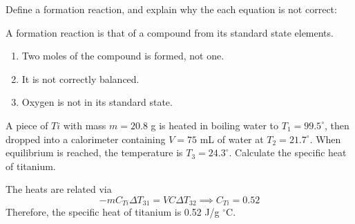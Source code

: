 \documentclass[answers]{exam}
\begin{document}
\begin{questions}
\bigskip
\question Define a formation reaction, and explain why the each equation is not correct:
%
\begin{solutionbox}{1.1in}
  A formation reaction is that of a compound from its standard state elements.
  \begin{enumerate}
    \item Two moles of the compound is formed, not one.
    \item It is not correctly balanced.
    \item Oxygen is not in its standard state.
  \end{enumerate}
\end{solutionbox}

\newpage
\question A piece of $Ti$ with mass $m = 20.8$ g is heated in boiling water to $T_1 = 99.5^\circ$, then dropped into a calorimeter containing $V = 75$ mL of water at $T_2 = 21.7^\circ$. When equilibrium is reached, the temperature is $T_3 = 24.3^\circ$. Calculate the specific heat of titanium.
\begin{solutionbox}{1in}
  The heats are related via \begin{equation}
    - m C_{Ti} \Delta T_{31} = V C \Delta T_{32} \implies C_{Ti} = 0.52
  \end{equation}
  Therefore, the specific heat of titanium is 0.52 J/g $^\circ$C.
\end{solutionbox}


\end{questions}
\end{document}
